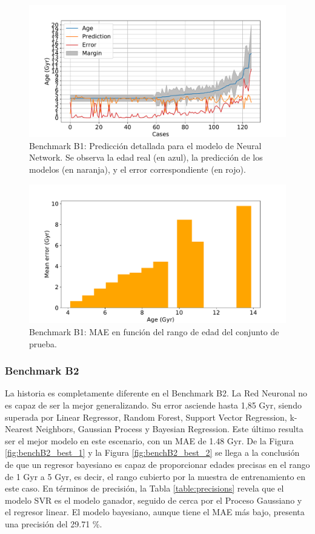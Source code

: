 \begin{figure}[H]
\begin{center}
 \includegraphics[width=0.8\linewidth]{Figuras/Experimentos/B_B1_nnet_2.pdf}
\end{center}
\caption{Benchmark B1: Predicción detallada para el modelo de Neural Network. Se observa la edad real (en azul), la predicción de los modelos (en naranja), y el error correspondiente (en rojo).}
 \label{fig:benchB1_best_2}
\end{figure}

\begin{figure}[H]
\begin{center}
 \includegraphics[width=0.8\linewidth]{Figuras/Experimentos/B_B1_nnet_3.pdf}
\end{center}
\caption{Benchmark B1: MAE en función del rango de edad del conjunto de prueba.}
 \label{fig:benchB1_best_3}
\end{figure}

\subsubsection{Benchmark B2} 

La historia es completamente diferente en el Benchmark B2. La Red Neuronal no es capaz de ser la mejor generalizando. Su error asciende hasta 1,85 Gyr, siendo superada por Linear Regressor, Random Forest, Support Vector Regression, k-Nearest Neighbors, Gaussian Process y Bayesian Regression. %
Este último resulta ser el mejor modelo en este escenario, con un MAE de 1.48 Gyr. De la Figura \ref{fig:benchB2_best_1} y la Figura \ref{fig:benchB2_best_2} se llega a la conclusión de que un regresor bayesiano es capaz de proporcionar edades precisas en el rango de 1 Gyr a 5 Gyr, es decir, el rango cubierto por la muestra de entrenamiento en este caso. En términos de precisión, la Tabla \ref{table:precisions} revela que el modelo SVR es el modelo ganador, seguido de cerca por el Proceso Gaussiano y el regresor linear. El modelo bayesiano, aunque tiene el MAE más bajo, presenta una precisión del 29.71 \%.

